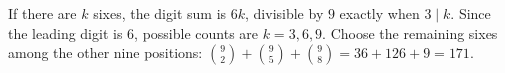 If there are $k$ sixes, the digit sum is $6k$, divisible by $9$ exactly when $3\mid k$. Since the leading digit is $6$, possible counts are $k=3,6,9$. Choose the remaining sixes among the other nine positions: $\binom92+\binom95+\binom98=36+126+9=\boxed{171}$.
